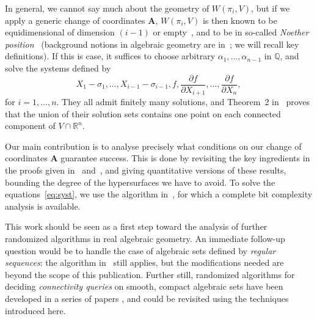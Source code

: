 \documentclass[sigconf]{acmart}
\def\mA{{\bm A}}
\def\Q{\mathbb{Q}}
\def\R{\mathbb{R}}
\def\pa{\partial}
\begin{document}
In general, we cannot say much about the geometry of
$W(\pi_i,V)$, but if we apply a generic change of coordinates $\mA$,
$W(\pi_i,V)$ is then known to be equidimensional of dimension $(i-1)$
or empty~\cite{BaGiHeMb97}, and to be in so-called {\em Noether
  position}~\cite{EMP} (background notions in algebraic geometry are
in~\cite{Mumford76,Shafarevich77,ECA}; we will recall key
definitions). If this is case, it suffices to choose arbitrary
$\alpha_1,\dots,\alpha_{n-1}$ in $\Q$, and solve the systems defined
by
\begin{equation}\label{eq:syst}
X_1-\sigma_1,\dots,X_{i-1}-\sigma_{i-1}, f, \frac{\pa f}{\pa
  X_{i+1}} ,\dots,\frac{\pa f}{\pa X_n},  
\end{equation}
for $i=1,\dots,n$.  They all admit finitely many solutions, and
Theorem~2 in~\cite{EMP} proves that the union of their solution sets
contains one point on each connected component of $V \cap \R^n$.

Our main contribution is to analyse precisely what conditions on our
change of coordinates $\mA$ guarantee success. This is done by
revisiting the key ingredients in the proofs given
in~\cite{BaGiHeMb97} and~\cite{EMP}, and giving quantitative versions
of these results, bounding the degree of the hypersurfaces we have to
avoid.  To solve the equations~\eqref{eq:syst}, we use the algorithm
in~\cite{SH}, for which a complete bit complexity analysis is
available.

This work should be seen as a first step toward the analysis of
further randomized algorithms in real algebraic geometry. An immediate
follow-up question would be to handle the case of algebraic sets
defined by {\em regular sequences}: the algorithm in~\cite{EMP} still
applies, but the modifications needed are beyond the scope of this
publication. Further still, randomized algorithms for deciding {\em
  connectivity queries} on smooth, compact algebraic sets have been
developed in a series of papers
\cite{SchostMohabBabySteps2011,SchostMohabBabySteps2014}, and could be
revisited using the techniques introduced here.
\end{document}
